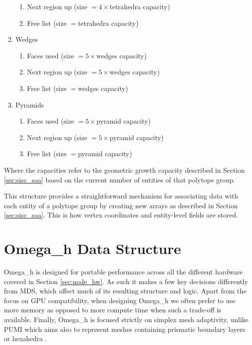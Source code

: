 \begin{enumerate}
\begin{enumerate}
  \item Next region up (size $=4\times$tetrahedra capacity)
  \item Free list (size $=$tetrahedra capacity)
  \end{enumerate}
\item Wedges
  \begin{enumerate}
  \item Faces used (size $=5\times$wedges capacity)
  \item Next region up (size $=5\times$wedges capacity)
  \item Free list (size $=$wedges capacity)
  \end{enumerate}
\item Pyramids
  \begin{enumerate}
  \item Faces used (size $=5\times$pyramid capacity)
  \item Next region up (size $=5\times$pyramid capacity)
  \item Free list (size $=$pyramid capacity)
  \end{enumerate}
\end{enumerate}
Where the capacities refer to the geometric growth
capacity described in Section \ref{sec:sisc_soa} based
on the current number of entities of that polytope group.

This structure provides a straightforward mechanism for associating
data with each entity of a polytope group by creating
new arrays as described in Section \ref{sec:sisc_soa}.
This is how vertex coordinates and entity-level fields
are stored.

\section{Omega\_h Data Structure}
\label{sec:omega_h-struct}

Omega\_h is designed for portable performance across
all the different hardware covered in Section \ref{sec:node_hw}.
As such it makes a few key decisions differently from MDS,
which affect much of its resulting structure and logic.
Apart from the focus on GPU compatibility, when designing
Omega\_h we often prefer to use more memory as opposed
to more compute time when such a trade-off is available.
Finally, Omega\_h is focused strictly on simplex mesh
adaptivity, unlike PUMI which aims also to represent
meshes containing prismatic boundary layers \cite{ovcharenko2013parallel}
or hexahedra \cite{seol2006efficient}.

